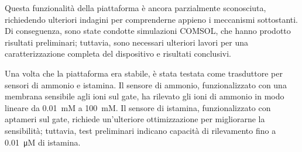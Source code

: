 Questa funzionalità della piattaforma è ancora parzialmente sconosciuta, richiedendo ulteriori indagini per comprenderne appieno i meccanismi sottostanti. Di conseguenza, sono state condotte simulazioni COMSOL, che hanno prodotto risultati preliminari; tuttavia, sono necessari ulteriori lavori per una caratterizzazione completa del dispositivo e risultati conclusivi.

Una volta che la piattaforma era stabile, è stata testata come trasduttore per sensori di ammonio e istamina. Il sensore di ammonio, funzionalizzato con una membrana sensibile agli ioni sul gate, ha rilevato gli ioni di ammonio in modo lineare da \SI{0.01}{mM} a \SI{100}{mM}. Il sensore di istamina, funzionalizzato con aptameri sul gate, richiede un'ulteriore ottimizzazione per migliorarne la sensibilità; tuttavia, test preliminari indicano capacità di rilevamento fino a \SI{0.01}{\micro M} di istamina.